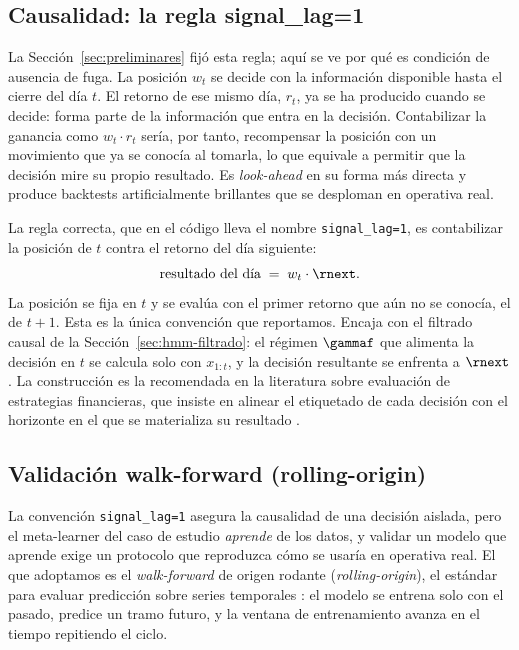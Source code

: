 \subsection{Causalidad: la regla signal\_lag=1}
\label{sec:cpcv-causalidad}

La Sección~\ref{sec:preliminares} fijó esta regla; aquí se ve por qué es condición de ausencia de fuga. La posición $w_t$ se decide con la información disponible hasta el cierre del día $t$. El retorno de ese mismo día, $r_t$, ya se ha producido cuando se decide: forma parte de la información que entra en la decisión. Contabilizar la ganancia como $w_t \cdot r_t$ sería, por tanto, recompensar la posición con un movimiento que ya se conocía al tomarla, lo que equivale a permitir que la decisión mire su propio resultado. Es \emph{look-ahead} en su forma más directa y produce backtests artificialmente brillantes que se desploman en operativa real.

La regla correcta, que en el código lleva el nombre \texttt{signal\_lag=1}, es contabilizar la posición de $t$ contra el retorno del día siguiente:
\[
\text{resultado del día} \;=\; w_t \cdot \rnext.
\]
La posición se fija en $t$ y se evalúa con el primer retorno que aún no se conocía, el de $t+1$. Esta es la única convención que reportamos. Encaja con el filtrado causal de la Sección~\ref{sec:hmm-filtrado}: el régimen $\gammaf$ que alimenta la decisión en $t$ se calcula solo con $x_{1:t}$, y la decisión resultante se enfrenta a $\rnext$. La construcción es la recomendada en la literatura sobre evaluación de estrategias financieras, que insiste en alinear el etiquetado de cada decisión con el horizonte en el que se materializa su resultado \cite{lopezdeprado2018}.

\subsection{Validación walk-forward (rolling-origin)}
\label{sec:cpcv-walkforward}

La convención \texttt{signal\_lag=1} asegura la causalidad de una decisión aislada, pero el meta-learner del caso de estudio \emph{aprende} de los datos, y validar un modelo que aprende exige un protocolo que reproduzca cómo se usaría en operativa real. El que adoptamos es el \emph{walk-forward} de origen rodante (\emph{rolling-origin}), el estándar para evaluar predicción sobre series temporales \cite{tashman2000, bergmeir2018}: el modelo se entrena solo con el pasado, predice un tramo futuro, y la ventana de entrenamiento avanza en el tiempo repitiendo el ciclo.

